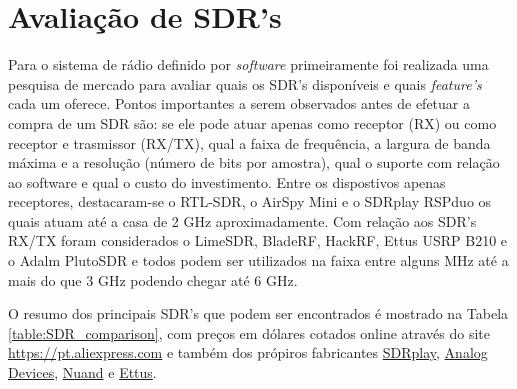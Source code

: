 \documentclass[
  12pt,				%
  openright,			%
  twoside,			%
  a4paper,			%
  english,			%
  french,				%
  spanish,			%
  brazil,				%
  ]{abntex2}
\begin{document}
\section*{Avaliação de SDR's}

Para o sistema de rádio definido por \textit{software} primeiramente foi realizada uma pesquisa de mercado para avaliar quais os SDR's disponíveis e quais
\textit{feature's} cada um oferece. Pontos importantes a serem observados antes de efetuar a compra de um SDR são: se ele pode atuar apenas como receptor
(RX) ou como receptor e trasmissor (RX/TX), qual a faixa de frequência, a largura de banda máxima e a resolução (número de bits por amostra), qual o suporte
com relação ao software e qual o custo do investimento. Entre os dispostivos apenas receptores, destacaram-se o RTL-SDR, o AirSpy Mini e o SDRplay RSPduo
os quais atuam até a casa de 2 GHz aproximadamente. Com relação aos SDR's RX/TX foram considerados o LimeSDR, BladeRF, HackRF, Ettus USRP B210 e o
Adalm PlutoSDR e todos podem ser utilizados na faixa entre alguns MHz até a mais do que 3 GHz podendo chegar até 6 GHz.

O resumo dos principais SDR's que podem ser encontrados é mostrado na Tabela \ref{table:SDR_comparison}, com preços em dólares cotados online através do site \href{https://pt.aliexpress.com}{https://pt.aliexpress.com}
e também dos própiros fabricantes \href{https://www.sdrplay.com/rspduo/}{SDRplay}, \href{https://www.analog.com/en/design-center/evaluation-hardware-and-software/evaluation-boards-kits/adalm-pluto.html}{Analog Devices},
\href{https://www.nuand.com/bladerf-1/}{Nuand} e \href{https://www.ettus.com/all-products/ub210-kit/}{Ettus}.
\end{document}
